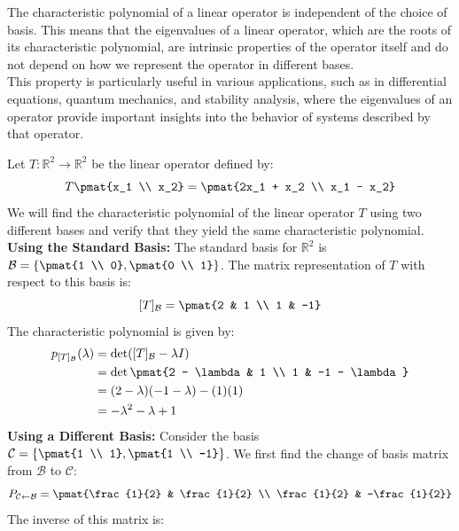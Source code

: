 \documentclass[openany]{book}
\begin{document}
\begin{mynote}
    The characteristic polynomial of a linear operator is independent of the choice of basis. This means that the eigenvalues of a linear operator, which are the roots of its characteristic polynomial, are intrinsic properties of the operator itself and do not depend on how we represent the operator in different bases. \\
    This property is particularly useful in various applications, such as in differential equations, quantum mechanics, and stability analysis, where the eigenvalues of an operator provide important insights into the behavior of systems described by that operator.
\end{mynote}
\begin{example}
    Let $T: \mathbb{R}^2 \to \mathbb{R}^2$ be the linear operator defined by:
    $$T\pmat{x_1 \\ x_2} = \pmat{2x_1 + x_2 \\ x_1 - x_2}$$
    We will find the characteristic polynomial of the linear operator $T$ using two different bases and verify that they yield the same characteristic polynomial.\\
    \textbf{Using the Standard Basis:}
    The standard basis for $\mathbb{R}^2$ is $\mathcal{B} = \left\{\pmat{1 \\ 0}, \pmat{0 \\ 1}\right\}$. The matrix representation of $T$ with respect to this basis is:
    $$[T]_{\mathcal{B}} = \pmat{2 & 1 \\ 1 & -1}$$
    The characteristic polynomial is given by:
    \[
    \begin{aligned}
    p_{[T]_{\mathcal{B}}}(\lambda) &= \det([T]_{\mathcal{B}} - \lambda I) \\
    &= \det\pmat{2 - \lambda & 1 \\ 1 & -1 - \lambda} \\
    &= (2 - \lambda)(-1 - \lambda) - (1)(1) \\
    &= -\lambda^2 - \lambda + 1
    \end{aligned}
    \] 
    \textbf{Using a Different Basis:}
    Consider the basis $\mathcal{C} = \left\{\pmat{1 \\ 1}, \pmat{1 \\ -1}\right\}$. We first find the change of basis matrix from $\mathcal{B}$ to $\mathcal{C}$:
    $$P_{\mathcal{C} \leftarrow \mathcal{B}} = \pmat{\frac{1}{2} & \frac{1}{2} \\ \frac{1}{2} & -\frac{1}{2}}$$
    The inverse of this matrix is:

\end{example}
\end{document}
